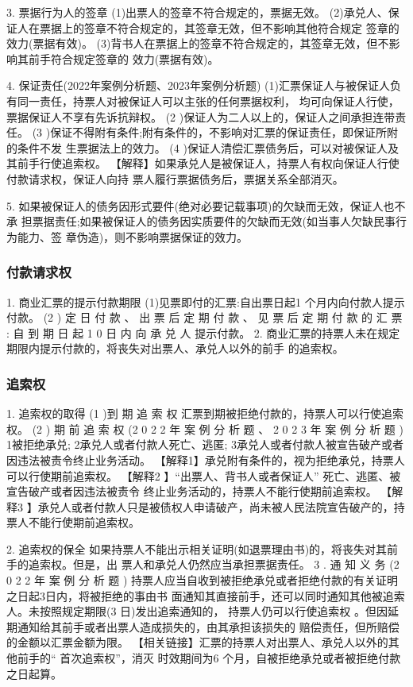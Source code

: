 \documentclass[UTF8,12pt]{ctexart}
\numberwithin{equation}{section} %
\numberwithin{figure}{section}
\numberwithin{table}{section}
\begin{document}
	 3. 票据行为人的签章
	 (1)出票人的签章不符合规定的，票据无效。 (2)承兑人、保证人在票据上的签章不符合规定的，其签章无效，但不影响其他符合规定 签章的效力(票据有效)。 (3)背书人在票据上的签章不符合规定的，其签章无效，但不影响其前手符合规定签章的 效力(票据有效)。
	 
	 4. 保证责任(2022年案例分析题、2023年案例分析题) (1)汇票保证人与被保证人负有同一责任，持票人对被保证人可以主张的任何票据权利， 均可向保证人行使，票据保证人不享有先诉抗辩权。
	 (2 )保证人为二人以上的，保证人之间承担连带责任。
	 (3 )保证不得附有条件;附有条件的，不影响对汇票的保证责任，即保证所附的条件不发 生票据法上的效力。
	 (4 )保证人清偿汇票债务后，可以对被保证人及其前手行使追索权。 【解释】如果承兑人是被保证人，持票人有权向保证人行使付款请求权，保证人向持 票人履行票据债务后，票据关系全部消灭。
	 
	 5. 如果被保证人的债务因形式要件(绝对必要记载事项)的欠缺而无效，保证人也不承 担票据责任;如果被保证人的债务因实质要件的欠缺而无效(如当事人欠缺民事行为能力、签 章伪造)，则不影响票据保证的效力。
	 
	 
	
	\subsubsection{付款请求权} 
	1. 商业汇票的提示付款期限
	(1)见票即付的汇票:自出票日起1 个月内向付款人提示付款。
	(2 ) 定 日 付 款 、 出 票 后 定 期 付 款 、 见 票 后 定 期 付 款 的 汇 票 : 自 到 期 日 起 1 0 日 内 向 承 兑 人 提示付款。
	2. 商业汇票的持票人未在规定期限内提示付款的，将丧失对出票人、承兑人以外的前手 的追索权。
	
	\subsubsection{追索权}
	
	1. 追索权的取得
	(1 )到 期 追 索 权
	汇票到期被拒绝付款的，持票人可以行使追索权。
	(2 ) 期 前 追 索 权 (2 0 2 2 年 案 例 分 析 题 、 2 0 2 3 年 案 例 分 析 题 ) 1被拒绝承兑;
	2承兑人或者付款人死亡、逃匿; 3承兑人或者付款人被宣告破产或者因违法被责令终止业务活动。
	【解释1】承兑附有条件的，视为拒绝承兑，持票人可以行使期前追索权。
	【解释2 】“出票人、背书人或者保证人” 死亡、逃匿、被宣告破产或者因违法被责令 终止业务活动的，持票人不能行使期前追索权。
	【解释3 】承兑人或者付款人只是被债权人申请破产，尚未被人民法院宣告破产的，持 票人不能行使期前追索权。
	
	2. 追索权的保全 如果持票人不能出示相关证明(如退票理由书)的，将丧失对其前手的追索权。但是，出 票人和承兑人仍然应当承担票据责任。
	3 . 通 知 义 务 (2 0 2 2 年 案 例 分 析 题 ) 持票人应当自收到被拒绝承兑或者拒绝付款的有关证明之日起3日内，将被拒绝的事由书 面通知其直接前手，还可以同时通知其他被追索人。未按照规定期限(3 日)发出追索通知的， 持票人仍可以行使追索权 。但因延期通知给其前手或者出票人造成损失的，由其承担该损失的 赔偿责任，但所赔偿的金额以汇票金额为限。
	【相关链接】汇票的持票人对出票人、承兑人以外的其他前手的“ 首次追索权”，消灭 时效期间为6 个月，自被拒绝承兑或者被拒绝付款之日起算。
	
\end{document}
